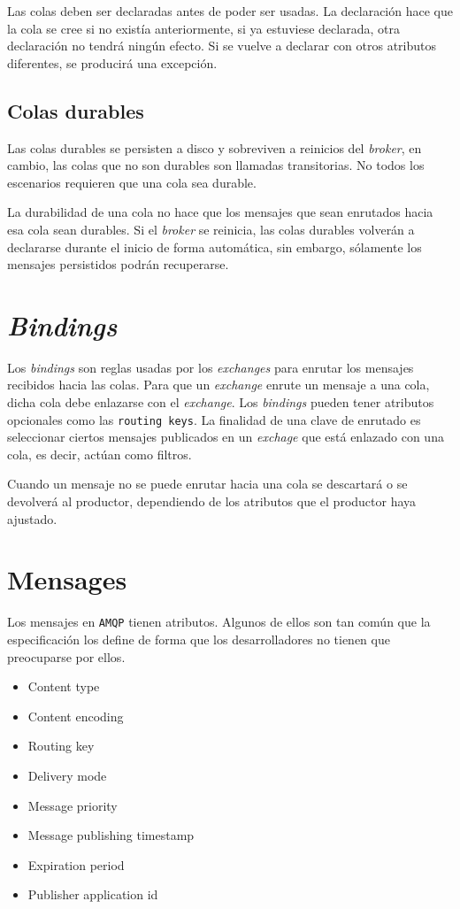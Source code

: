 Las colas deben ser declaradas antes de poder ser usadas. La declaración hace que
la cola se cree si no existía anteriormente, si ya estuviese declarada, otra
declaración no tendrá ningún efecto. Si se vuelve a declarar con otros atributos
diferentes, se producirá una excepción.

\subsection{Colas durables}

Las colas durables se persisten a disco y sobreviven a reinicios del \emph{broker},
en cambio, las colas que no son durables son llamadas transitorias. No todos los
escenarios requieren que una cola sea durable.

La durabilidad de una cola no hace que los mensajes que sean enrutados hacia esa
cola sean durables. Si el \emph{broker} se reinicia, las colas durables volverán
a declararse durante el inicio de forma automática, sin embargo, sólamente los
mensajes persistidos podrán recuperarse.

\section{\emph{Bindings}}

Los \emph{bindings} son reglas usadas por los \emph{exchanges} para enrutar los
mensajes recibidos hacia las colas. Para que un \emph{exchange} enrute un mensaje
a una cola, dicha cola debe enlazarse con el \emph{exchange}. Los \emph{bindings}
pueden tener atributos opcionales como las \texttt{routing keys}. La finalidad
de una clave de enrutado es seleccionar ciertos mensajes publicados en un \emph{exchage}
que está enlazado con una cola, es decir, actúan como filtros.

Cuando un mensaje no se puede enrutar hacia una cola se descartará o se devolverá
al productor, dependiendo de los atributos que el productor haya ajustado.

\section{Mensages}

Los mensajes en \texttt{AMQP} tienen atributos. Algunos de ellos son tan común
que la especificación los define de forma que los desarrolladores no tienen que
preocuparse por ellos.

\begin{itemize}\itemsep1pt \parskip0pt 
\item Content type
\item Content encoding
\item Routing key
\item Delivery mode
\item Message priority
\item Message publishing timestamp
\item Expiration period
\item Publisher application id
\end{itemize}

